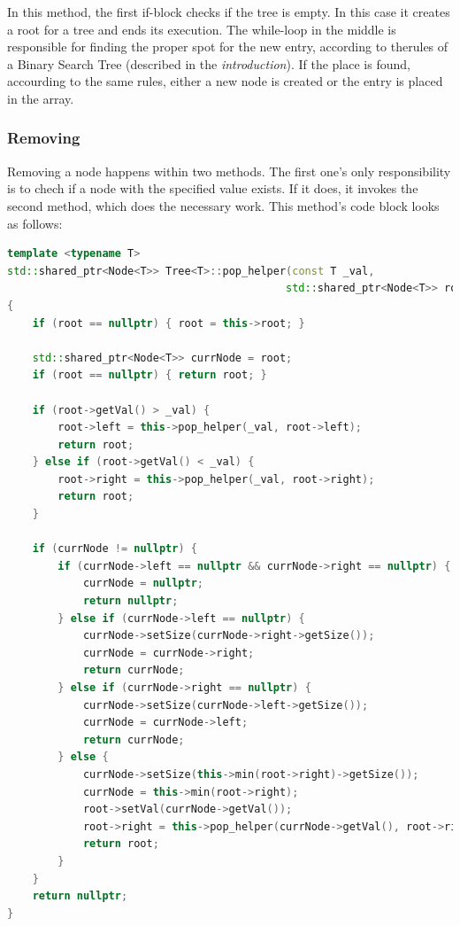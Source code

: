 \documentclass[12pt]{article}
\begin{document}
In this method, the first if-block checks if the tree is empty. In this case it creates a root for a tree and ends its execution. The while-loop in the middle is responsible for finding the proper spot for the new entry, according to therules of a Binary Search Tree (described in the \textit{introduction}). If the place is found, accourding to the same rules, either a new node is created or the entry is placed in the array.

\pagebreak
\subsubsection{Removing}
Removing a node happens within two methods. The first one's only responsibility is to chech if a node with the specified value exists. If it does, it invokes the second method, which does the necessary work. This method's code block looks as follows:
\begin{footnotesize}
\begin{lstlisting}[language=C++]
template <typename T>
std::shared_ptr<Node<T>> Tree<T>::pop_helper(const T _val, 
                                            std::shared_ptr<Node<T>> root) 
{
    if (root == nullptr) { root = this->root; }

    std::shared_ptr<Node<T>> currNode = root;
    if (root == nullptr) { return root; }

    if (root->getVal() > _val) {
        root->left = this->pop_helper(_val, root->left);
        return root;
    } else if (root->getVal() < _val) {
        root->right = this->pop_helper(_val, root->right);
        return root;
    }

    if (currNode != nullptr) {
        if (currNode->left == nullptr && currNode->right == nullptr) {
            currNode = nullptr;
            return nullptr;
        } else if (currNode->left == nullptr) {
            currNode->setSize(currNode->right->getSize());  
            currNode = currNode->right;                    
            return currNode;
        } else if (currNode->right == nullptr) {
            currNode->setSize(currNode->left->getSize());
            currNode = currNode->left;                    
            return currNode;
        } else {                                         
            currNode->setSize(this->min(root->right)->getSize());
            currNode = this->min(root->right);
            root->setVal(currNode->getVal());
            root->right = this->pop_helper(currNode->getVal(), root->right);
            return root;
        }
    }
    return nullptr;
}
\end{lstlisting}
\end{footnotesize}
\pagebreak
\end{document}

